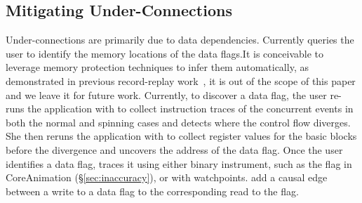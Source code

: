 \subsection{Mitigating Under-Connections}\label{subsec:fix-under}

Under-connections are primarily due to data dependencies.  Currently \xxx
queries the user to identify the memory locations of the data flags.It
is conceivable to leverage memory protection techniques to infer them
automatically, as demonstrated in previous record-replay
work~\cite{king2005debugging, dunlap2008execution}, it is out of the scope of this paper and we leave it for
future work.  Currently, to discover a data flag, the user re-runs the
application with \xxx to collect instruction traces of the concurrent
events in both the normal and spinning cases and detects where the control
flow diverges. She then reruns the application with \xxx to collect
register values for the basic blocks before the divergence and uncovers
the address of the data flag.  Once the user identifies a data flag, \xxx
traces it using either binary instrument, such as the 
flag in CoreAnimation (\S\ref{sec:inaccuracy}), or with
watchpoints.  \xxx add a causal edge between a write to a data flag to the
corresponding read to the flag.
